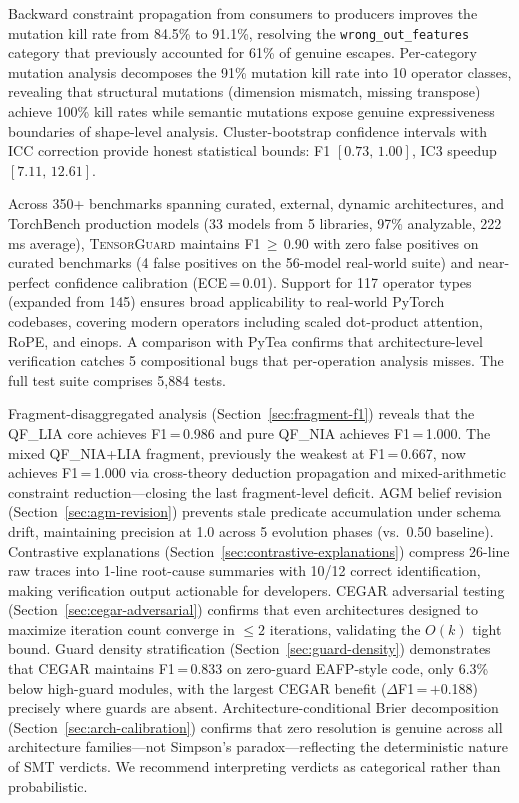 \documentclass[11pt]{article}
\begin{document}
Backward constraint propagation from consumers to producers improves
the mutation kill rate from 84.5\% to 91.1\%, resolving the
\texttt{wrong\_out\_features} category that previously accounted for
61\% of genuine escapes.
Per-category mutation analysis decomposes the 91\% mutation kill
rate into 10 operator classes, revealing that structural mutations
(dimension mismatch, missing transpose) achieve 100\% kill rates
while semantic mutations expose genuine expressiveness boundaries
of shape-level analysis.  Cluster-bootstrap confidence intervals
with ICC correction provide honest statistical bounds:
F1 $[0.73,\, 1.00]$, IC3 speedup $[7.11,\, 12.61]$.

Across 350+ benchmarks spanning curated, external, dynamic
architectures, and TorchBench production models (33 models from
5 libraries, 97\% analyzable, 222\,ms average),
\textsc{TensorGuard} maintains F1\,$\geq$\,0.90
with zero false positives on curated benchmarks (4 false positives on
the 56-model real-world suite) and
near-perfect confidence calibration (ECE\,=\,0.01).
Support for 117 operator types (expanded from 145) ensures broad applicability
to real-world PyTorch codebases, covering modern operators including
scaled dot-product attention, RoPE, and einops.
A comparison with PyTea confirms that architecture-level
verification catches 5 compositional bugs that per-operation analysis
misses.  The full test suite comprises 5,884 tests.

Fragment-disaggregated analysis (Section~\ref{sec:fragment-f1})
reveals that the QF\_LIA core achieves F1\,=\,0.986 and pure
QF\_NIA achieves F1\,=\,1.000.  The mixed QF\_NIA+LIA fragment,
previously the weakest at F1\,=\,0.667, now achieves F1\,=\,1.000
via cross-theory deduction propagation and mixed-arithmetic
constraint reduction---closing the last fragment-level deficit.
AGM belief revision (Section~\ref{sec:agm-revision}) prevents
stale predicate accumulation under schema drift, maintaining
precision at 1.0 across 5 evolution phases (vs.\ 0.50 baseline).
Contrastive explanations (Section~\ref{sec:contrastive-explanations})
compress 26-line raw traces into 1-line root-cause summaries
with 10/12 correct identification, making verification output
actionable for developers.
CEGAR adversarial testing (Section~\ref{sec:cegar-adversarial})
confirms that even architectures designed to maximize iteration
count converge in $\leq 2$ iterations, validating the $O(k)$
tight bound.
Guard density stratification (Section~\ref{sec:guard-density})
demonstrates that CEGAR maintains F1\,=\,0.833 on zero-guard
EAFP-style code, only 6.3\% below high-guard modules, with
the largest CEGAR benefit ($\Delta$F1\,=\,$+$0.188) precisely
where guards are absent.
Architecture-conditional Brier decomposition
(Section~\ref{sec:arch-calibration}) confirms that zero
resolution is genuine across all architecture families---not
Simpson's paradox---reflecting the deterministic nature of
SMT verdicts.  We recommend interpreting verdicts as categorical
rather than probabilistic.
\end{document}
